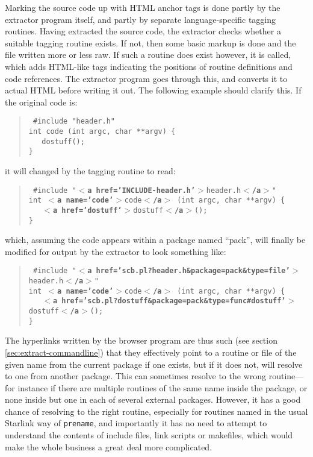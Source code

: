 \documentclass[twoside,11pt]{article}
\renewcommand{\_}{\texttt{\symbol{95}}}
\begin{document}
Marking the source code up with HTML anchor tags 
is done partly by the extractor program itself, 
and partly by separate language-specific tagging routines.
Having extracted the source code, the extractor 
checks whether a suitable tagging routine exists. 
If not, then some basic markup is done and the file written 
more or less raw.
If such a routine does exist however, it is called, 
which adds
HTML-like tags indicating the positions of routine definitions 
and code references.
The extractor program goes through this, and converts it to 
actual HTML before writing it out.
The following example should clarify this.  
If the original code is:
%
%
\begin{quote}
{\tt
\#include "header.h" \\
int code (int argc, char **argv) \{ \\
\mbox{}~~~do\_stuff(); \\
\}
}
\end{quote}
it will changed by the tagging routine to read:
\begin{quote}
{\tt
\#include "{\bf $<$a href='INCLUDE-header.h'$>$}header.h{\bf $<$/a$>$}" \\
int {\bf $<$a name='code'$>$}code{\bf $<$/a$>$} (int argc, char **argv) \{ \\
\mbox{}~~~{\bf $<$a href='do\_stuff'$>$}do\_stuff{\bf $<$/a$>$}(); \\
\}
}
\end{quote}
which, assuming the code appears within a package named ``pack'', 
will finally be modified for output by the extractor to look something like:
\begin{quote}
{\tt
\#include "{\bf $<$a href='scb.pl?header.h\&package=pack\&type=file'$>$}header.h{\bf $<$/a$>$}" \\
int {\bf $<$a name='code'$>$}code{\bf $<$/a$>$} (int argc, char **argv) \{ \\
\mbox{}~~~{\bf $<$a~href='scb.pl?do\_stuff\&package=pack\&type=func\#do\_stuff'$>$}do\_stuff{\bf $<$/a$>$}(); \\
\}
}
\end{quote}
The hyperlinks written by the browser program are thus such
(see section \ref{sec:extract-commandline})
that they effectively point to a routine or file of the given name from
the current package if one exists, but if it does not, will resolve to
one from another package.
This can sometimes resolve to the wrong routine---for instance
if there are multiple routines of the same name inside the
package, or none inside but one in each of several external packages.
However, it has a good chance of resolving to the right routine,
especially for routines named in the usual Starlink way of
{\tt pre\_name}, and importantly it has no need to attempt to 
understand the contents of include files, link scripts or makefiles, which 
would make the whole business a great deal more complicated.
\end{document}
